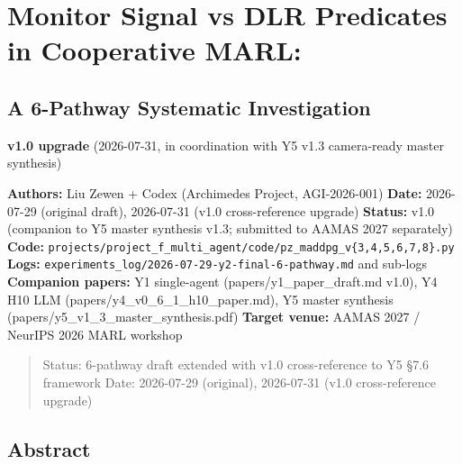 \documentclass[
]{article}
\author{}
\date{}
\begin{document}
\section{Monitor Signal vs DLR Predicates in Cooperative
MARL:}\label{monitor-signal-vs-dlr-predicates-in-cooperative-marl}

\subsection{A 6-Pathway Systematic
Investigation}\label{a-6-pathway-systematic-investigation}

\textbf{v1.0 upgrade} (2026-07-31, in coordination with Y5 v1.3
camera-ready master synthesis)

\textbf{Authors:} Liu Zewen + Codex (Archimedes Project, AGI-2026-001)
\textbf{Date:} 2026-07-29 (original draft), 2026-07-31 (v1.0
cross-reference upgrade) \textbf{Status:} v1.0 (companion to Y5 master
synthesis v1.3; submitted to AAMAS 2027 separately) \textbf{Code:}
\texttt{projects/project\_f\_multi\_agent/code/pz\_maddpg\_v\{3,4,5,6,7,8\}.py}
\textbf{Logs:}
\texttt{experiments\_log/2026-07-29-y2-final-6-pathway.md} and sub-logs
\textbf{Companion papers:} Y1 single-agent (papers/y1\_paper\_draft.md
v1.0), Y4 H10 LLM (papers/y4\_v0\_6\_1\_h10\_paper.md), Y5 master
synthesis (papers/y5\_v1\_3\_master\_synthesis.pdf) \textbf{Target
venue:} AAMAS 2027 / NeurIPS 2026 MARL workshop

\begin{quote}
Status: 6-pathway draft extended with v1.0 cross-reference to Y5 §7.6
framework Date: 2026-07-29 (original), 2026-07-31 (v1.0 cross-reference
upgrade)
\end{quote}

\subsection{Abstract}\label{abstract}
\end{document}
